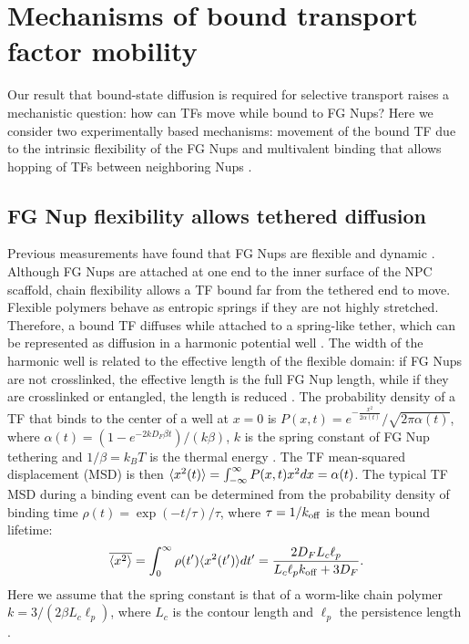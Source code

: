 \section*{Mechanisms of  bound transport factor mobility}

Our result that bound-state diffusion is required for selective
transport raises a mechanistic question: how can TFs move while bound
to FG Nups? Here we consider two experimentally based mechanisms:
movement of the bound TF due to the intrinsic flexibility of the FG
Nups \cite{patel07} and multivalent binding that allows hopping of TFs
between neighboring Nups \cite{raveh16}.

\subsection*{FG Nup flexibility allows tethered diffusion}
Previous measurements have found that FG Nups are flexible and dynamic
\cite{lim07, milles14, hough15}. Although FG Nups are attached at one
end to the inner surface of the NPC scaffold, chain flexibility allows
a  TF bound far from the tethered end to move.  Flexible polymers
behave as entropic springs \cite{howard01} if they are not highly
stretched. Therefore, a bound TF diffuses while attached to a
spring-like tether, which can be represented as diffusion in a
harmonic potential well .  The width of the
harmonic well is related to the effective length of the flexible
domain: if FG Nups are not crosslinked, the effective length is the full FG Nup
length, while if they are crosslinked or entangled, the length is
reduced \cite{ribbeck01}.  The probability density of a TF that binds
to the center of a well at $x=0$ is
$P(x,t) = e^{-\frac{x^2}{2 \alpha(t)}}/\sqrt{2\pi \alpha(t)}$, where
$ \alpha(t) = (1-e^{-2kD_F\beta t})/(k\beta)$, $k$ is the spring
constant of FG Nup tethering and $1/\beta = k_BT$ is the thermal
energy \cite{cau12}.  The TF mean-squared displacement (MSD) is then
$\langle x^2(t) \rangle = \int_{-\infty}^{\infty} P(x,t) x^2 dx = \alpha(t)$.
The typical TF MSD during a binding event can be determined from the
probability density of binding time
$\rho (t) = \exp(-t/\tau)/\tau$, where $\tau = 1/k_{\rm off}$ is the mean
bound lifetime:
\begin{equation}\label{eq:sho}
  \overline{\langle x^2 \rangle} = \int_0^{\infty} \rho(t') \langle x^2(t') \rangle dt' = \frac{2D_F L_c
    \ell_p}{L_c \ell_p k_{\rm off}+ 3D_F}. 
\end{equation} 
Here we assume that the spring constant is that of a worm-like chain
polymer $k = 3/(2\beta L_c \ell_p)$, where $L_c$ is the contour length
and $\ell_p$ the persistence length \cite{howard01}.

